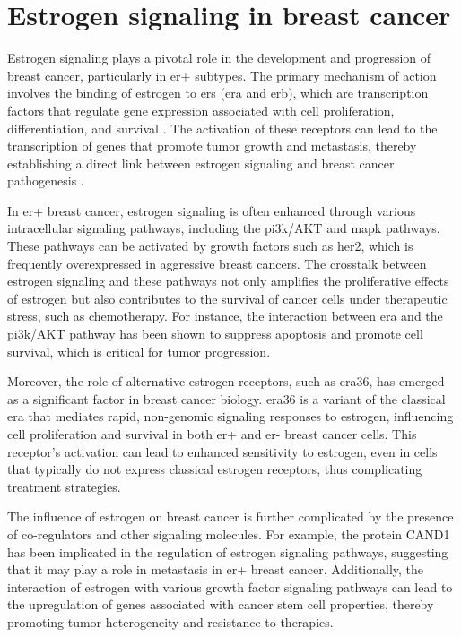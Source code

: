 \section{Estrogen signaling in breast cancer}
\label{sec:estrogen_signaling}

Estrogen signaling plays a pivotal role in the development and progression of
breast cancer, particularly in \gls{er+} subtypes.
The primary mechanism of action involves the binding of estrogen to \glspl{er}
(\gls{era} and \gls{erb}), which are transcription factors that regulate gene
expression associated with cell proliferation, differentiation, and survival
\supercite{misawa_estrogen-related_2015,lattouf_lkb1_2016}.
The activation of these receptors can lead to the transcription of genes that
promote tumor growth and metastasis, thereby establishing a direct link between
estrogen signaling and breast cancer pathogenesis
\supercite{feng_cross-talk_2020}.

In \gls{er+} breast cancer, estrogen signaling is often enhanced through
various intracellular signaling pathways, including the \gls{pi3k}/AKT and
\gls{mapk} pathways.
These pathways can be activated by growth factors such as \gls{her2}, which is
frequently overexpressed in aggressive breast
cancers\supercite{bratton_regulation_2010,salmeron-hernandez_bcas2_2019}.
The crosstalk between estrogen signaling and these pathways not only amplifies
the proliferative effects of estrogen but also contributes to the survival of
cancer cells under therapeutic stress, such as
chemotherapy\supercite{bratton_regulation_2010,george_hypoxia_2012}.
For instance, the interaction between \gls{era} and the \gls{pi3k}/AKT pathway
has been shown to suppress apoptosis and promote cell survival, which is
critical for tumor
progression\supercite{bratton_regulation_2010,george_hypoxia_2012}.

Moreover, the role of alternative estrogen receptors, such as \gls{era}36, has
emerged as a significant factor in breast cancer biology.
\gls{era}36 is a variant of the classical \gls{era} that mediates
rapid, non-genomic signaling responses to estrogen, influencing cell
proliferation and survival in both \gls{er+} and \gls{er-} breast cancer
cells\supercite{deng_er-36-mediated_2014,zhang_positive_2011}.
This receptor's activation can lead to enhanced sensitivity to estrogen, even
in cells that typically do not express classical estrogen receptors, thus
complicating treatment strategies\supercite{zhang_positive_2011}.

The influence of estrogen on breast cancer is further complicated by the
presence of co-regulators and other signaling molecules.
For example, the protein CAND1 has been implicated in the regulation of
estrogen signaling pathways, suggesting that it may play a role in metastasis
in \gls{er+} breast cancer\supercite{alhammad_bioinformatics_2022}.
Additionally, the interaction of estrogen with various growth factor signaling
pathways can lead to the upregulation of genes associated with cancer stem cell
properties, thereby promoting tumor heterogeneity and resistance to
therapies\supercite{fillmore_estrogen_2010,xue_sox9fxyd3src_2019}.

